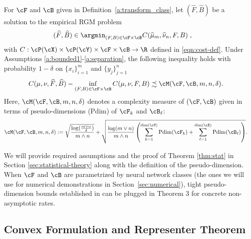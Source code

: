 \documentclass[11pt]{article}
\begin{document}
\begin{theorem}
	\label{thm:stat}
	For $\cF$ and $\cB$ given in Definition~\ref{a:transform_class}, let $(\widehat{F}, \widehat{B})$ be a solution to the empirical RGM problem 
	\begin{align*}
		& (\widehat{F}, \widehat{B}) \in \argmin_{(F, B) \in \cF \times \cB} C(\widehat{\mu}_m, \widehat{\nu}_n, F, B)\;,
	\end{align*}
	with $C: \cP(\cX) \times \cP(\cY) \times \cF \times \cB \rightarrow \R$ defined in \eqref{eqn:cost-def}. Under Assumptions \ref{a:bounded1}-\ref{a:separation}, the following inequality holds with probability $1- \delta$ on $\{x_i\}_{i = 1}^m$ and $\{y_j\}_{j = 1}^n$
	\begin{align}
		C(\mu, \nu, \widehat{F}, \widehat{B}) - \inf_{(F, B) \in \cF \times \cB} C(\mu, \nu, F, B)  \precsim \cM(\cF, \cB, m, n, \delta).
	\end{align}
	Here, $\cM(\cF, \cB, m, n, \delta)$ denotes a complexity measure of $(\cF, \cB)$ given in terms of pseudo-dimensions (Pdim) of $\cF_k$ and $\cB_\ell$:
	\begin{equation*}
		\cM(\cF, \cB, m, n, \delta)
		:=
		\sqrt{\frac{\log(\tfrac{m \vee n}{\delta})}{m\wedge n}} + \sqrt{\frac{\log(m \vee n)}{m\wedge n} \left( \sum_{k =1}^{{\rm dim}(\cY)} {\rm Pdim}(\cF_{k}) + \sum_{\ell = 1}^{{\rm dim}(\cX)} {\rm Pdim}(\cB_{\ell}) \right)}.
	\end{equation*}
\end{theorem}
We will provide required assumptions and the proof of Theorem \ref{thm:stat} in Section \ref{sec:statistical-theory} along with the definition of the pseudo-dimension. When $\cF$ and $\cB$ are parametrized by neural network classes (the ones we will use for numerical demonstrations in Section~\ref{sec:numerical}), tight pseudo-dimension bounds established in \cite{anthony_bartlett_1999, harvey2017NearlytightVCdimension} can be plugged in Theorem 3 for concrete non-asymptotic rates. 




\subsection{Convex Formulation and Representer Theorem}
\label{subsec:cvx-representer}
\end{document}
